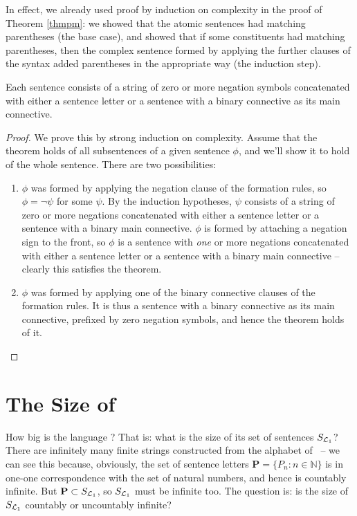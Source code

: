 In effect, we already used proof by induction on complexity in the proof of Theorem \ref{thmpm}: we showed that the atomic sentences had matching parentheses (the base case), and showed that if some constituents had matching parentheses, then the complex sentence formed by applying the further clauses of the syntax added parentheses in the appropriate way (the induction step). 

\begin{theorem}
Each sentence consists of a string of zero or more negation symbols concatenated with either a sentence letter or a sentence with a binary connective as its main connective.
\begin{proof}
	We prove this by strong induction on complexity. Assume that the theorem holds of all subsentences of a given sentence $\phi$, and we'll show it to hold of the whole sentence. There are two possibilities: \begin{enumerate}
		\item $\phi$ was formed by applying the negation clause of the formation rules, so $\phi = \neg\psi$ for some $\psi$. By the induction hypotheses, $\psi$ consists of a string of zero or more negations concatenated with either a sentence letter or a sentence with a binary main connective. $\phi$ is formed by attaching a negation sign to the front, so $\phi$ is a sentence with \emph{one} or more negations concatenated with either a sentence letter or a sentence with a binary main connective – clearly this satisfies the theorem.
		\item $\phi$ was formed by applying one of the binary connective clauses of the formation rules. It is thus a sentence with a binary connective as its main connective, prefixed by zero negation symbols, and hence the theorem holds of it.
	\end{enumerate}	
\end{proof}\end{theorem}



\section{The Size of \texorpdfstring{\lone}{L1}}

How big is the language \lone? That is: what is the size of its set of sentences $S_{\mathcal{L}_{1}}$? There are infinitely many finite strings constructed from the alphabet of \lone\ – we can see this because, obviously, the set of sentence letters $\mathbf{P}=\{P_{n}:n \in \mathbb{N}\}$ is in one-one correspondence with the set of natural numbers, and hence is countably infinite. But $\mathbf{P}\subset S_{\mathcal{L}_{1}}$, so $S_{\mathcal{L}_{1}}$ must be infinite too. The question is: is the size of $S_{\mathcal{L}_{1}}$ countably or uncountably infinite?

